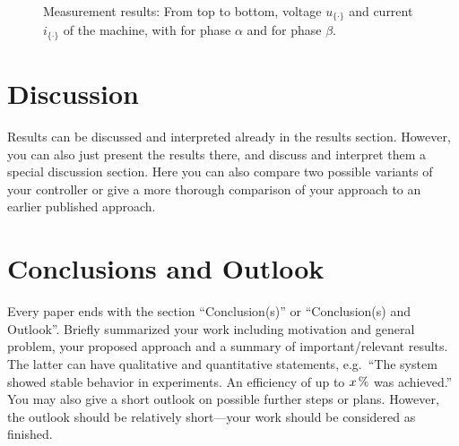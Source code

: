 \documentclass[journal]{IEEEtran}
\newlength\figureheight
\newlength\figurewidth
\begin{document}
\begin{figure}[h!]
    \centering
    \footnotesize %
	\setlength\figureheight{4cm}
	\setlength\figurewidth{7cm}
	
	\newcommand{\blueline}{\protect\tikz{\protect\draw[blue, line width=0.5pt] (0,-0.5ex)(0,0)--(4ex,0);}}
	\newcommand{\redline}{\protect\tikz{\protect\draw[red, line width=0.5pt] (0,-0.5ex)(0,0)--(4ex,0);}}
    \caption{Measurement results: From top to bottom, voltage $u_{\{\cdot\}}$ and current $i_{\{\cdot\}}$ of the machine, with \blueline{} for phase $\alpha$ and \redline{} for phase $\beta$.}
    \label{Matlab2TikzExample.tikz}
\end{figure}




\section{Discussion}

Results can be discussed and interpreted already in the results section. However, you can also just present the results there, and discuss and interpret them a special discussion section. Here you can also compare two possible variants of your controller or give a more thorough comparison of your approach to an earlier published approach.





\section{Conclusions and Outlook}

Every paper ends with the section “Conclusion(s)” or “Conclusion(s) and Outlook”. Briefly summarized your work including motivation and general problem, your proposed approach and a summary of important/relevant results. The latter can have qualitative and quantitative statements, e.g.\ “The system showed stable behavior in experiments. An efficiency of up to $\unit[x]{\%}$ was achieved.” You may also give a short outlook on possible further steps or plans. However, the outlook should be relatively short---your work should be considered as finished.




\end{document}

